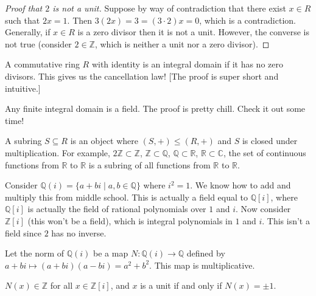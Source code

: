 \begin{proof}[Proof that $2$ is not a unit]
Suppose by way of contradiction that there exist $x \in R$ such that $2x = 1$. Then $3(2x) = 3 = (3 \cdot 2)x = 0$, which is a contradiction. Generally, if $x \in R$ is a zero divisor then it is not a unit. However, the converse is not true (consider $2 \in \mathbb{Z}$, which is neither a unit nor a zero divisor).
\end{proof}

\begin{definition}
A commutative ring $R$ with identity is an integral domain if it has no zero divisors. This gives us the cancellation law! [The proof is super short and intuitive.]
\end{definition}

\begin{proposition}
Any finite integral domain is a field. The proof is pretty chill. Check it out some time!
\end{proposition}

\begin{definition}[Subring]
A subring $S \subseteq R$ is an object where $(S,+) \leq (R,+)$ and $S$ is closed under multiplication. For example, $2\mathbb{Z} \subset \mathbb{Z}$, $\mathbb{Z} \subset \mathbb{Q}$, $\mathbb{Q} \subset \mathbb{R}$, $\mathbb{R} \subset \mathbb{C}$, the set of continuous functions from $\mathbb{R}$ to $\mathbb{R}$ is a subring of all functions from $\mathbb{R}$ to $\mathbb{R}$.
\end{definition}

\begin{example}
Consider $\mathbb{Q}(i) = \{a + bi \mid a,b \in \mathbb{Q}\}$ where $i^2 = 1$. We know how to add and multiply this from middle school. This is actually a field equal to $\mathbb{Q}[i]$, where $\mathbb{Q}[i]$ is actually the field of rational polynomials over $1$ and $i$. Now consider $\mathbb{Z}[i]$ (this won't be a field), which is integral polynomials in $1$ and $i$. This isn't a field since $2$ has no inverse.
\end{example}

\begin{definition}[Norm]
Let the norm of $\mathbb{Q}(i)$ be a map $N : \mathbb{Q}(i) \to \mathbb{Q}$ defined by $a + bi \mapsto (a+bi)(a-bi) = a^2+b^2$. This map is multiplicative.
\end{definition}

\begin{proposition}
$N(x) \in \mathbb{Z}$ for all $x \in \mathbb{Z}[i]$, and $x$ is a unit if and only if $N(x) = \pm 1$.
\end{proposition}